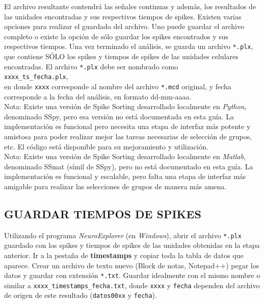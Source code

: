 \documentclass[10pt]{article}
\begin{document}
El archivo resultante contendrá las señales continuas y además, los resultados de las unidades encontradas y sus respectivos tiempos de spikes. Existen varias opciones para realizar el guardado del archivo. Uno puede guardar el archivo completo o existe la opción de sólo guardar los spikes encontrados y sus respectivos tiempos. Una vez terminado el análisis, se guarda un archivo \verb+*.plx+, que contiene SÓLO los spikes y tiempos de spikes de las unidades celulares encontradas. El archivo \verb+*.plx+ debe ser nombrado como \\

\verb+xxxx_ts_fecha.plx+, \\

en donde \verb+xxxx+ corresponde al nombre del archivo \verb+*.mcd+ original, y fecha corresponde a la fecha del análisis, en formato dd-mm-aaaa. \\


Nota: Existe una versión de Spike Sorting desarrollado localmente en \textit{Python}, denominado SSpy, pero esa versión no está documentada en esta guía. La implementación es funcional pero necesita una etapa de interfaz más potente y amistosa para poder realizar mejor las tareas necesarias de selección de grupos, etc. El código está disponible para su mejoramiento y utilización.\\

Nota: Existe una versión de Spike Sorting desarrollado localmente en \textit{Matlab}, denominado SSmat (símil de SSpy), pero no está documentado en esta guía. La implementación es funcional y escalable, pero falta una etapa de interfaz más amigable para realizar las selecciones de grupos de manera más amena. \\

\newpage

\subsection{ GUARDAR TIEMPOS DE SPIKES}
	
Utilizando el programa \textit{NeuroExplorer} (en \textit{Windows}), abrir el archivo \verb+*.plx+ guardado con los spikes y tiempos de spikes de las unidades obtenidas en la etapa anterior. Ir a la pestaña de \textbf{timestamps} y copiar toda la tabla de datos que aparece. Crear un archivo de texto nuevo (Block de notas, Notepad++) pegar los datos y guardar con extensión \verb+*.txt+. Guardar idealmente con el mismo nombre o similar a \verb+xxxx_timestamps_fecha.txt+, donde \verb+xxxx+ y \verb+fecha+ dependen del archivo de origen de este resultado (\verb+datos00xx+ y \verb+fecha+). \\
\end{document}
